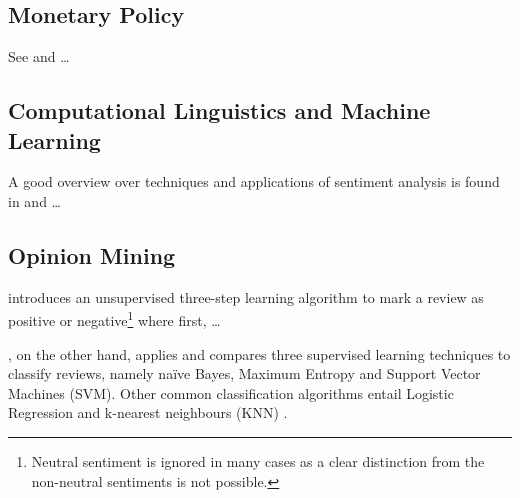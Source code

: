 
\subsection{Monetary Policy}

See \textcite{Mishkin.2007} and \textcite{Cecchetti.2006} \dots

\subsection{Computational Linguistics and Machine Learning}

A good overview over techniques and applications of sentiment analysis is found in \textcite{Feldman.2013} and \textcite{Liu.2012} \dots



\subsection{Opinion Mining}

\textcite{Turney.2002} introduces an unsupervised three-step learning algorithm to mark a review as positive or negative\footnote{Neutral sentiment is ignored in many cases as a clear distinction from the non-neutral sentiments is not possible.} where first, \dots


\textcite{Pang.2002}, on the other hand, applies and compares three supervised learning techniques to classify reviews, namely na\"{i}ve Bayes, Maximum Entropy and Support Vector Machines (SVM). Other common classification algorithms entail Logistic Regression and k-nearest neighbours (KNN) \parencite{Feldman.2013}.

